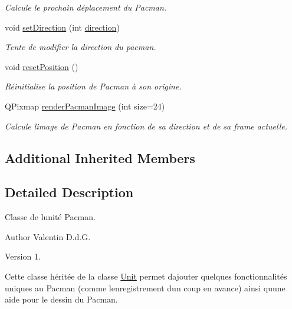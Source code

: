 \begin{DoxyCompactItemize}
\begin{DoxyCompactList}\small\item\em Calcule le prochain déplacement du Pacman. \end{DoxyCompactList}\item 
void \hyperlink{class_pacman_unit_a40f1adb4bd0a91b8bef0fb73bd64fb33}{set\+Direction} (int \hyperlink{class_unit_a5d8a5a789acfa4d2502b0c1082876172}{direction})
\begin{DoxyCompactList}\small\item\em Tente de modifier la direction du pacman. \end{DoxyCompactList}\item 
\hypertarget{class_pacman_unit_aedfa1c220c161792b887a5ab75efcaac}{}void \hyperlink{class_pacman_unit_aedfa1c220c161792b887a5ab75efcaac}{reset\+Position} ()\label{class_pacman_unit_aedfa1c220c161792b887a5ab75efcaac}

\begin{DoxyCompactList}\small\item\em Réinitialise la position de Pacman à son origine. \end{DoxyCompactList}\item 
Q\+Pixmap \hyperlink{class_pacman_unit_aeafee04941b0de276151d43480d9d645}{render\+Pacman\+Image} (int size=24)
\begin{DoxyCompactList}\small\item\em Calcule l\textquotesingle{}image de Pacman en fonction de sa direction et de sa frame actuelle. \end{DoxyCompactList}\end{DoxyCompactItemize}
\subsection*{Additional Inherited Members}


\subsection{Detailed Description}
Classe de l\textquotesingle{}unité Pacman. 

\begin{DoxyAuthor}{Author}
Valentin D.\+d.\+G. 
\end{DoxyAuthor}
\begin{DoxyVersion}{Version}
1.
\end{DoxyVersion}
Cette classe héritée de la classe \hyperlink{class_unit}{Unit} permet d\textquotesingle{}ajouter quelques fonctionnalités uniques au Pacman (comme l\textquotesingle{}enregistrement d\textquotesingle{}un coup en avance) ainsi qu\textquotesingle{}une aide pour le dessin du Pacman. 

